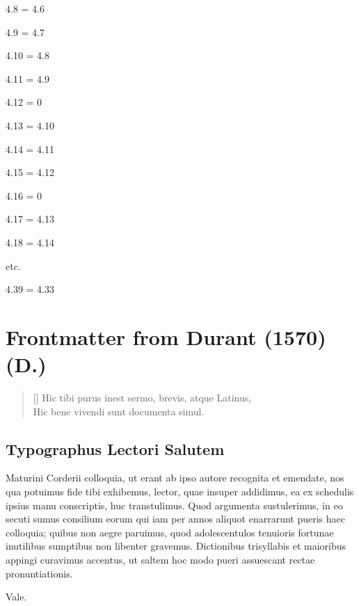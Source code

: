 \documentclass{article}
\begin{document}
\begin{english}
\begin{multicols}{4}
4.8 = 4.6

4.9 = 4.7

4.10 = 4.8

4.11 = 4.9

4.12 = 0

4.13 = 4.10

4.14 = 4.11

4.15 = 4.12

4.16 = 0

4.17 = 4.13

4.18 = 4.14

etc.

4.39 = 4.33
\end{multicols}

\pagebreak
{}
{}
\section*{Frontmatter from Durant (1570) (D.)}
\end{english}

\settowidth{\versewidth}{Hic tibi purus inest sermo, brevis, atque Latinus,}
\begin{verse}[\versewidth] Hic tibi purus inest sermo, brevis, atque Latinus,\\ Hic bene vivendi sunt documenta simul.\end{verse}

\subsection*{Typographus Lectori Salutem}
\setlength{\parindent}{1em}
Maturini Corderii colloquia, ut erant ab ipso autore recognita et emendate, nos qua potuimus fide tibi exhibemus, lector, quae insuper addidimus, ea ex schedulis ipsius manu conscriptis, huc transtulimus. Quod argumenta sustulerimus, in eo secuti sumus consilium eorum qui iam per annos aliquot enarrarunt pueris haec colloquia; quibus non aegre paruimus, quod adolescentulos tenuioris fortunae inutilibus sumptibus non libenter gravemus. Dictionibus trisyllabis et maioribus appingi curavimus accentus, ut saltem hoc modo pueri assuescant rectae pronuntiationis.

Vale.

{}
\end{document}
